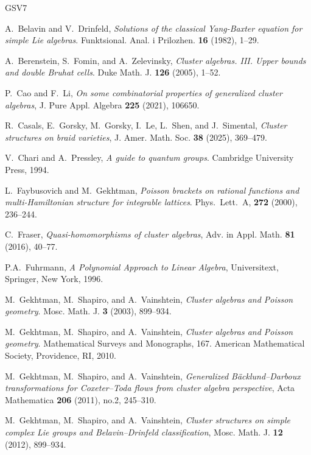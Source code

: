 \documentclass{amsart}
\theoremstyle{definition}
\theoremstyle{remark}
\numberwithin{equation}{section}
\numberwithin{theorem}{section}
\begin{document}
\begin{thebibliography}{GSV7}

 A.~Belavin and V.~Drinfeld,
\textit{Solutions of the classical Yang-Baxter equation for simple Lie algebras}.
Funktsional. Anal. i Prilozhen. {\bf16} (1982), 1--29.

  A.~Berenstein, S.~Fomin, and A.~Zelevinsky,
\textit{Cluster algebras. III. Upper bounds and double Bruhat cells}. 
Duke Math. J. \textbf{126} (2005), 1--52.

 P.~Cao and F.~Li,
{\it On some combinatorial properties of generalized cluster algebras}, J. Pure Appl. Algebra {\bf 225} (2021), 106650.

 R.~Casals, E.~Gorsky, M.~Gorsky, I.~Le, L.~Shen, and J.~Simental, \textit{Cluster structures on braid varieties},
J. Amer. Math. Soc. \textbf{38} (2025), 369--479.

 V.~Chari and A.~Pressley, \textit{A guide to quantum groups}.
Cambridge University Press, 1994.



 L.~Faybusovich and M.~Gekhtman,
\textit{Poisson brackets on rational functions and multi-Hamiltonian structure for integrable
lattices}.
Phys.~Lett.~A, \textbf{272} (2000), 236--244.


  C.~Fraser, {\it Quasi-homomorphisms of cluster algebras}, Adv. in Appl. Math. {\bf 81} (2016), 40--77. 

 P.A.~Fuhrmann, {\it A Polynomial Approach to Linear Algebra}, Universitext, Springer, New 
York, 1996.

  M.~Gekhtman, M.~Shapiro, and A.~Vainshtein,
\textit{Cluster algebras and Poisson geometry}.  
Mosc. Math. J. \textbf{3} (2003), 899--934.

  M.~Gekhtman, M.~Shapiro, and A.~Vainshtein,
\textit{Cluster algebras and Poisson geometry}.
Mathematical Surveys and Monographs, 167. American Mathematical Society, Providence, RI, 2010.

  M.~Gekhtman, M.~Shapiro, and A.~Vainshtein,
{\it Generalized B\"acklund--Darboux transformations for Coxeter--Toda flows from cluster algebra perspective}, Acta Mathematica {\bf 206} (2011), no.2, 245--310.


  M.~Gekhtman, M.~Shapiro, and A.~Vainshtein,  
\textit{Cluster structures on simple complex Lie groups and Belavin--Drinfeld classification},
Mosc. Math. J. \textbf{12} (2012), 899--934.



\end{thebibliography}
\end{document}
